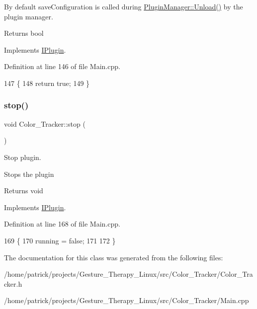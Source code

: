 By default save\+Configuration is called during \hyperlink{class_plugin_manager_ab651a05d6fcb92562807e9f5ecc30855}{Plugin\+Manager\+::\+Unload()} by the plugin manager.

\begin{DoxyReturn}{Returns}
bool 
\end{DoxyReturn}


Implements \hyperlink{class_i_plugin_a79b5c42b1c7b08257a6110b2091039bc}{I\+Plugin}.



Definition at line 146 of file Main.\+cpp.


\begin{DoxyCode}
147 \{
148     \textcolor{keywordflow}{return} \textcolor{keyword}{true};
149 \}
\end{DoxyCode}
\mbox{\label{class_color___tracker_acc726eb03c58c22460c4f0440cfbc4cc}} 
\subsubsection{\texorpdfstring{stop()}{stop()}}
{\footnotesize\ttfamily void Color\+\_\+\+Tracker\+::stop (\begin{DoxyParamCaption}{ }\end{DoxyParamCaption})\hspace{0.3cm}{\ttfamily [virtual]}}



Stop plugin. 

Stops the plugin \begin{DoxyReturn}{Returns}
void 
\end{DoxyReturn}


Implements \hyperlink{class_i_plugin_a86e523c283aec5c9fb21249a76e916ac}{I\+Plugin}.



Definition at line 168 of file Main.\+cpp.


\begin{DoxyCode}
169 \{
170     running = \textcolor{keyword}{false};
171 
172 \}
\end{DoxyCode}


The documentation for this class was generated from the following files\+:\begin{DoxyCompactItemize}
\item 
/home/patrick/projects/\+Gesture\+\_\+\+Therapy\+\_\+\+Linux/src/\+Color\+\_\+\+Tracker/Color\+\_\+\+Tracker.\+h\item 
/home/patrick/projects/\+Gesture\+\_\+\+Therapy\+\_\+\+Linux/src/\+Color\+\_\+\+Tracker/Main.\+cpp\end{DoxyCompactItemize}
